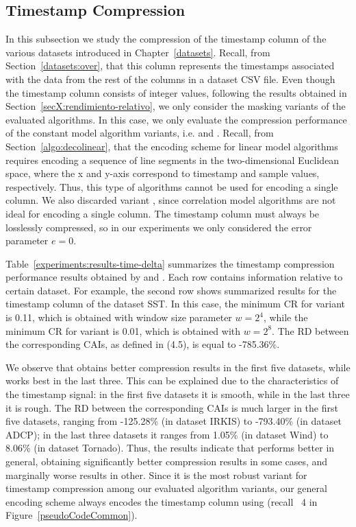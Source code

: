 
\vspace{-13pt}
\subsection{Timestamp Compression}
\label{secX:timestampComp}

In this subsection we study the compression of the timestamp column of the various datasets introduced in Chapter~\ref{datasets}. Recall, from Section~\ref{datasets:over}, that this column represents the timestamps associated with the data from the rest of the columns in a dataset CSV file. Even though the timestamp column consists of integer values, following the results obtained in Section~\ref{secX:rendimiento-relativo}, we only consider the masking variants of the evaluated algorithms. In this case, we only evaluate the compression performance of the constant model algorithm variants, i.e.  and . Recall, from Section~\ref{algo:decolinear}, that the encoding scheme for linear model algorithms requires encoding a sequence of line segments in the two-dimensional Euclidean space, where the x and y-axis correspond to timestamp and sample values, respectively. Thus, this type of algorithms cannot be used for encoding a single column. We also discarded variant , since correlation model algorithms are not ideal for encoding a single column. The timestamp column must always be losslessly compressed, so in our experiments we only considered the error parameter $e = 0$.

Table~\ref{experiments:results-time-delta} summarizes the timestamp compression performance results obtained by  and .  Each row contains information relative to certain dataset. For example, the second row shows summarized results for the timestamp column of the dataset SST. In this case, the minimum CR for variant  is 0.11, which is obtained with window size parameter $w=2^4$, while the minimum CR for variant  is 0.01, which is obtained with $w=2^8$. The RD between the corresponding CAIs, as defined in (4.5), is equal to -785.36\%.





\clearpage


We observe that  obtains better compression results in the first five datasets, while  works best in the last three. This can be explained due to the characteristics of the timestamp signal: in the first five datasets it is smooth, while in the last three it is rough. The RD between the corresponding CAIs is much larger in the first five datasets, ranging from -125.28\% (in dataset IRKIS) to -793.40\% (in dataset ADCP); in the last three datasets it ranges from 1.05\% (in dataset Wind) to 8.06\% (in dataset Tornado). Thus, the results indicate that  performs better in general, obtaining significantly better compression results in some cases, and marginally worse results in other. Since it is the most robust variant for timestamp compression among our evaluated algorithm variants, our general encoding scheme always encodes the timestamp column using  (recall \Line~4 in Figure~\ref{pseudoCodeCommon}).
